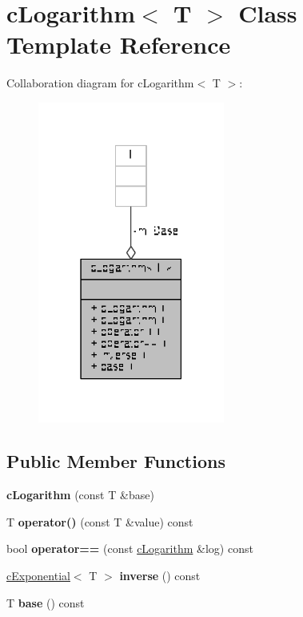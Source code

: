 \hypertarget{classcLogarithm}{\section{c\-Logarithm$<$ T $>$ Class Template Reference}
\label{classcLogarithm}
}


Collaboration diagram for c\-Logarithm$<$ T $>$\-:
\nopagebreak
\begin{figure}[H]
\begin{center}
\leavevmode
\includegraphics[width=174pt]{classcLogarithm__coll__graph}
\end{center}
\end{figure}
\subsection*{Public Member Functions}
\begin{DoxyCompactItemize}
\item 
\hypertarget{classcLogarithm_a9d9f82c880eedd380c823b95eb7f7040}{{\bfseries c\-Logarithm} (const T \&base)}\label{classcLogarithm_a9d9f82c880eedd380c823b95eb7f7040}

\item 
\hypertarget{classcLogarithm_a6241f3ae3a26b83ae394b0e1f22085ce}{T {\bfseries operator()} (const T \&value) const }\label{classcLogarithm_a6241f3ae3a26b83ae394b0e1f22085ce}

\item 
\hypertarget{classcLogarithm_a89c3a92fc60c11c2c14c6e7f78583a38}{bool {\bfseries operator==} (const \hyperlink{classcLogarithm}{c\-Logarithm} \&log) const }\label{classcLogarithm_a89c3a92fc60c11c2c14c6e7f78583a38}

\item 
\hypertarget{classcLogarithm_af2d609e92ed5b178e1bb4fca17c62609}{\hyperlink{classcExponential}{c\-Exponential}$<$ T $>$ {\bfseries inverse} () const }\label{classcLogarithm_af2d609e92ed5b178e1bb4fca17c62609}

\item 
\hypertarget{classcLogarithm_a6abe08f212b809055ae6556291383300}{T {\bfseries base} () const }\label{classcLogarithm_a6abe08f212b809055ae6556291383300}

\end{DoxyCompactItemize}
